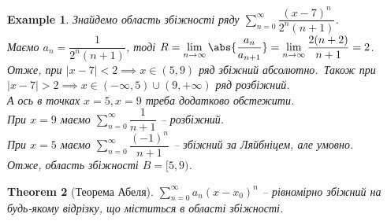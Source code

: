 \documentclass[a4paper, 10pt]{article}
\def\huge{\displaystyle}
\theoremstyle{theoremdd}
\newtheorem{theorem}{Theorem}[subsection]
\theoremstyle{theoremdd}
\theoremstyle{theoremdd}
\theoremstyle{theoremdd}
\theoremstyle{theoremdd}
\newtheorem{example}[theorem]{Example}
\theoremstyle{theoremdd}
\theoremstyle{theoremdd}
\theoremstyle{theoremdd}
\theoremstyle{theoremdd}
\begin{document}
\begin{example}
Знайдемо область збіжності ряду $\huge\sum_{n=0}^\infty \dfrac{(x-7)^n}{2^n (n+1)}$.\\
Маємо $a_n = \dfrac{1}{2^n (n+1)}$, тоді $R = \huge\lim_{n \to \infty} \abs{\dfrac{a_n}{a_{n+1}}} = \lim_{n \to \infty} \dfrac{2(n+2)}{n+1} = 2$.\\
Отже, при $|x-7| < 2 \implies x \in (5,9)$ ряд збіжний абсолютно.\
Також при $|x-7| > 2 \implies x \in (-\infty,5) \cup (9,+\infty)$ ряд розбіжний.\\
А ось в точках $x = 5, x = 9$ треба додатково обстежити.\\
При $x=9$ маємо $\huge\sum_{n=0}^\infty \dfrac{1}{n+1}$ -- розбіжний.\\
При $x=5$ маємо $\huge\sum_{n=0}^\infty \dfrac{(-1)^n}{n+1}$ -- збіжний за Ляйбніцем, але умовно.\\
Отже, область збіжності $B = [5,9)$.
\end{example}

\begin{theorem}[Теорема Абеля]
$\huge \sum_{n=0}^\infty a_n(x-x_0)^n$ -- рівномірно збіжний на будь-якому відрізку, що міститься в області збіжності.
\end{theorem}
\end{document}

